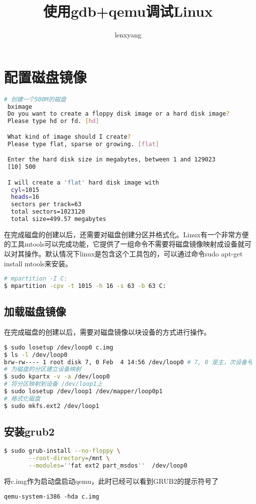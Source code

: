 \documentclass[b5paper,9pt,twoside,openany]{article}
\begin{document}
\title{使用gdb+qemu调试Linux}
\author{lenxyang}
\maketitle
\section{配置磁盘镜像}
\begin{lstlisting}[language=bash]
# 创建一个500M的磁盘
 bximage
 Do you want to create a floppy disk image or a hard disk image?
 Please type hd or fd. [hd] 

 What kind of image should I create?
 Please type flat, sparse or growing. [flat]

 Enter the hard disk size in megabytes, between 1 and 129023
 [10] 500

 I will create a 'flat' hard disk image with
  cyl=1015
  heads=16
  sectors per track=63
  total sectors=1023120
  total size=499.57 megabytes
\end{lstlisting}

在完成磁盘的创建以后，还需要对磁盘创建分区并格式化。Linux有一个非常方便的工具mtools可以完成功能，它提供了一组命令不需要将磁盘镜像映射成设备就可以对其操作。默认情况下linux是包含这个工具包的，可以通过命令sudo apt-get install mtools来安装。
\begin{lstlisting}[language=bash]
# mpartition -I C:
$ mpartition -cpv -t 1015 -h 16 -s 63 -b 63 C:
\end{lstlisting}

\subsection{加载磁盘镜像}
在完成磁盘的创建以后，需要对磁盘镜像以块设备的方式进行操作。
\begin{lstlisting}[language=bash]
$ sudo losetup /dev/loop0 c.img
$ ls -l /dev/loop0
brw-rw---- 1 root disk 7, 0 Feb  4 14:56 /dev/loop0 # 7, 0 是主，次设备号
# 为磁盘的分区建立设备映射
$ sudo kpartx -v -a /dev/loop0
# 将分区映射到设备 /dev/loop1上
$ sudo losetup /dev/loop1 /dev/mapper/loop0p1
# 格式化磁盘
$ sudo mkfs.ext2 /dev/loop1
\end{lstlisting}

\subsection{安装grub2}

\begin{lstlisting}[language=bash]
$ sudo grub-install --no-floppy \
       --root-directory=/mnt \
       --modules=''fat ext2 part_msdos''  /dev/loop0
\end{lstlisting}
将c.img作为启动盘启动qemu，此时已经可以看到GRUB2的提示符号了
\begin{lstlisting}
qemu-system-i386 -hda c.img
\end{lstlisting}
\end{document}
